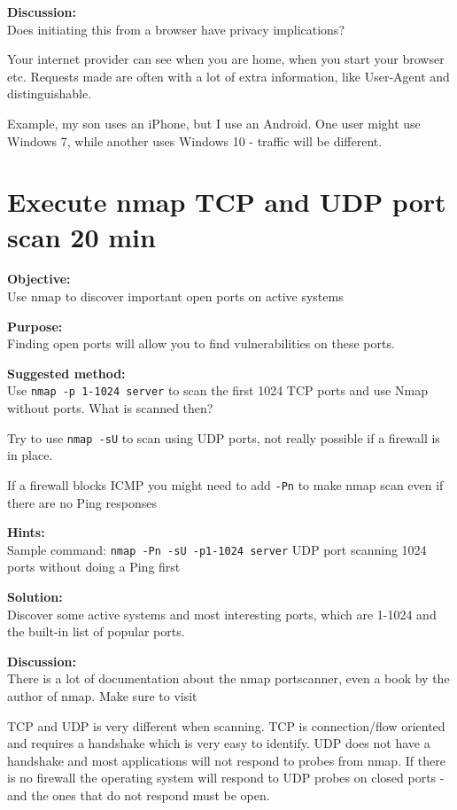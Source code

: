 \documentclass[a4paper,11pt,notitlepage]{report}
\begin{document}
{\bf Discussion:}\\
Does initiating this from a browser have privacy implications?

Your internet provider can see when you are home, when you start your browser etc. Requests made are often with a lot of extra information, like User-Agent and distinguishable.

Example, my son uses an iPhone, but I use an Android. One user might use Windows 7, while another uses Windows 10 - traffic will be different.



\chapter{Execute nmap TCP and UDP port scan 20 min}
\label{ex:nmap-synscan}


{\bf Objective:} \\
Use nmap to discover important open ports on active systems

{\bf Purpose:}\\
Finding open ports will allow you to find vulnerabilities on these ports.

{\bf Suggested method:}\\
Use \verb+nmap -p 1-1024 server+ to scan the first 1024 TCP
ports and use Nmap without ports. What is scanned then?

Try to use \verb+nmap -sU+ to scan using UDP ports, not really possible if a firewall is in place.

If a firewall blocks ICMP you might need to add \verb+-Pn+ to make nmap scan even if there are no Ping responses

{\bf Hints:} \\
Sample command: \verb+nmap -Pn -sU -p1-1024 server+ UDP port scanning
1024 ports without doing a Ping first

{\bf Solution:}\\
Discover some active systems and most interesting ports, which are 1-1024 and the built-in list of popular ports.

{\bf Discussion:}\\
There is a lot of documentation about the nmap portscanner, even a book by the author
of nmap. Make sure to visit 

TCP and UDP is very different when scanning. TCP is connection/flow oriented and requires a handshake which is very easy to identify. UDP does not have a handshake and most applications will not respond to probes from nmap. If there is no firewall the operating system will respond to UDP probes on closed ports - and the ones that do not respond must be open.
\end{document}
